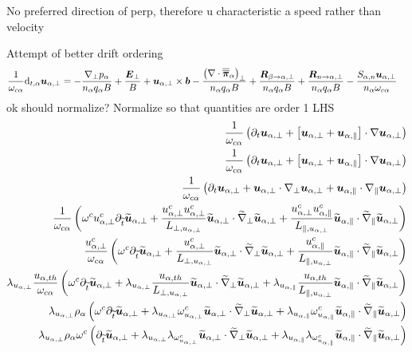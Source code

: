 No preferred direction of perp, therefore u characteristic a speed rather than velocity

Attempt of better drift ordering
%
\begin{align*}
 \frac{1}{\omega_{c\alpha}}\text{d}_{t,\alpha} \boldsymbol{u}_{\alpha,\perp}
 &=
 -
 \frac{
   \nabla_\perp p_\alpha
 }{n_\alpha  q_\alpha B}
 +
 \frac{\boldsymbol{E}_\perp}{B}
 +
 \boldsymbol{u}_{\alpha,\perp}\times\boldsymbol{b}
 -
  \frac{
   \left(\nabla\cdot\boldsymbol{\overline{\overline{\pi}}}_\alpha\right)_\perp
 }{n_\alpha  q_\alpha B}
 +
 \frac{
   \boldsymbol{R}_{\beta \to \alpha,\perp}
 }{n_\alpha q_\alpha B}
 +
 \frac{
   \boldsymbol{R}_{n \to \alpha,\perp}
 }{n_\alpha q_\alpha B}
 -
 \frac{
     S_{\alpha,n}\boldsymbol{u}_{\alpha,\perp}
 }{n_\alpha \omega_{c\alpha}}
\end{align*}
%
ok
should normalize?
Normalize so that quantities are order 1
LHS
%
\begin{align*}
 \frac{1}{\omega_{c\alpha}}
 \left(
 \partial_t \boldsymbol{u}_{\alpha,\perp}
 + \left[\boldsymbol{u}_{\alpha,\perp}
 + \boldsymbol{u}_{\alpha,\|}\right]\cdot\nabla\boldsymbol{u}_{\alpha,\perp}
 \right)
 \\
 \frac{1}{\omega_{c\alpha}}
 \left(
 \partial_t \boldsymbol{u}_{\alpha,\perp}
 + \left[\boldsymbol{u}_{\alpha,\perp}
 + \boldsymbol{u}_{\alpha,\|}\right]\cdot\nabla\boldsymbol{u}_{\alpha,\perp}
 \right)
 \\
 \frac{1}{\omega_{c\alpha}}
 \left(
 \partial_t \boldsymbol{u}_{\alpha,\perp}
 + \boldsymbol{u}_{\alpha,\perp}\cdot\nabla_\perp\boldsymbol{u}_{\alpha,\perp}
 + \boldsymbol{u}_{\alpha,\|}\cdot\nabla_\|\boldsymbol{u}_{\alpha,\perp}
 \right)
 \\
 \frac{1}{\omega_{c\alpha}}
 \left(
 \omega^cu^c_{\alpha,\perp}
 \partial_{\widetilde{ t}} \widetilde{ \boldsymbol{u}}_{\alpha,\perp}
 + \frac{u_{\alpha,\perp}^{c}u_{\alpha,\perp}^{c}}{L_{\perp, u_{\alpha,\perp}}}
 \widetilde{ \boldsymbol{u}}_{\alpha,\perp}\cdot\widetilde{ \nabla}_\perp\widetilde{ \boldsymbol{u}}_{\alpha,\perp}
 + \frac{u^c_{\alpha,\perp}u^c_{\alpha,\|}}{L_{\|, u_{\alpha,\perp}}}
 \widetilde{ \boldsymbol{u}}_{\alpha,\|}\cdot\widetilde{ \nabla}_\|\widetilde{ \boldsymbol{u}}_{\alpha,\perp}
 \right)
 \\
 \frac{u^c_{\alpha,\perp}}{\omega_{c\alpha}}
 \left(
 \omega^c
 \partial_{\widetilde{ t}} \widetilde{ \boldsymbol{u}}_{\alpha,\perp}
 + \frac{u^c_{\alpha,\perp}}{L_{\perp, u_{\alpha,\perp}}}
 \widetilde{ \boldsymbol{u}}_{\alpha,\perp}\cdot\widetilde{ \nabla}_\perp\widetilde{ \boldsymbol{u}}_{\alpha,\perp}
 + \frac{u^c_{\alpha,\|}}{L_{\|, u_{\alpha,\perp}}}
 \widetilde{ \boldsymbol{u}}_{\alpha,\|}\cdot\widetilde{ \nabla}_\|\widetilde{ \boldsymbol{u}}_{\alpha,\perp}
 \right)
 \\
 \lambda_{u_{\alpha,\perp}}
 \frac{u_{\alpha,th}}{\omega_{c\alpha}}
 \left(
 \omega^c
 \partial_{\widetilde{ t}} \widetilde{ \boldsymbol{u}}_{\alpha,\perp}
 +
 \lambda_{u_{\alpha,\perp}}
 \frac{ u_{\alpha,th} }{L_{\perp, u_{\alpha,\perp}}}
 \widetilde{ \boldsymbol{u}}_{\alpha,\perp}\cdot\widetilde{ \nabla}_\perp\widetilde{ \boldsymbol{u}}_{\alpha,\perp}
 +
 \lambda_{u_{\alpha,\|}}
 \frac{u_{\alpha,th}}{L_{\|, u_{\alpha,\perp}}}
 \widetilde{ \boldsymbol{u}}_{\alpha,\|}\cdot\widetilde{ \nabla}_\|\widetilde{ \boldsymbol{u}}_{\alpha,\perp}
 \right)
 \\
 \lambda_{u_{\alpha,\perp}}
 \rho_\alpha
 \left(
 \omega^c
 \partial_{\widetilde{ t}} \widetilde{ \boldsymbol{u}}_{\alpha,\perp}
 +
 \lambda_{u_{\alpha,\perp}}
 \omega^c_{u_{\alpha,\perp}}
 \widetilde{ \boldsymbol{u}}_{\alpha,\perp}\cdot\widetilde{ \nabla}_\perp\widetilde{ \boldsymbol{u}}_{\alpha,\perp}
 +
 \lambda_{u_{\alpha,\|}}
 \omega^c_{u_{\alpha,\|}}
 \widetilde{ \boldsymbol{u}}_{\alpha,\|}\cdot\widetilde{ \nabla}_\|\widetilde{ \boldsymbol{u}}_{\alpha,\perp}
 \right)
 \\
 \lambda_{u_{\alpha,\perp}}
 \rho_\alpha
 \omega^c
 \left(
 \partial_{\widetilde{ t}} \widetilde{ \boldsymbol{u}}_{\alpha,\perp}
 +
 \lambda_{u_{\alpha,\perp}}
 \lambda_{\omega^c_{u_{\alpha,\perp}}}
 \widetilde{ \boldsymbol{u}}_{\alpha,\perp}\cdot\widetilde{ \nabla}_\perp\widetilde{ \boldsymbol{u}}_{\alpha,\perp}
 +
 \lambda_{u_{\alpha,\|}}
 \lambda_{\omega^c_{u_{\alpha,\|}}}
 \widetilde{ \boldsymbol{u}}_{\alpha,\|}\cdot\widetilde{ \nabla}_\|\widetilde{ \boldsymbol{u}}_{\alpha,\perp}
 \right)
\end{align*}
